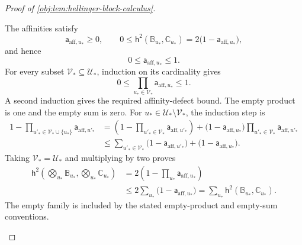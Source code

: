 \begin{proof}[Proof of \cref{obj:lem:hellinger-block-calculus}]
\begin{enumerate}
The affinities satisfy
\[
\mathsf a_{\mathrm{aff},u_*}\ge0,
\qquad
0\le\mathsf h^2(\mathbb B_{u_*},\mathbb C_{u_*})
   =2\bigl(1-\mathsf a_{\mathrm{aff},u_*}\bigr),
\]
and hence
\[
0\le\mathsf a_{\mathrm{aff},u_*}\le1.
\]
For every subset \(\mathcal V_*\subseteq\mathcal U_*\), induction on its cardinality gives
\[
0\le\prod_{u_*\in\mathcal V_*}\mathsf a_{\mathrm{aff},u_*}\le1.
\]
A second induction gives the required affinity-defect bound. The empty product is one and the empty sum is zero. For \(u_*\in\mathcal U_*\setminus\mathcal V_*\), the induction step is
\[
\begin{aligned}
1-\prod_{u'_*\in\mathcal V_*\cup\{u_*\}}
       \mathsf a_{\mathrm{aff},u'_*}
&=
\left(1-\prod_{u'_*\in\mathcal V_*}
       \mathsf a_{\mathrm{aff},u'_*}\right)
+
\bigl(1-\mathsf a_{\mathrm{aff},u_*}\bigr)
 \prod_{u'_*\in\mathcal V_*}\mathsf a_{\mathrm{aff},u'_*}\\
&\le
\sum_{u'_*\in\mathcal V_*}
 \bigl(1-\mathsf a_{\mathrm{aff},u'_*}\bigr)
+
\bigl(1-\mathsf a_{\mathrm{aff},u_*}\bigr).
\end{aligned}
\]
Taking \(\mathcal V_*=\mathcal U_*\) and multiplying by two proves
\[
\begin{aligned}
\mathsf h^2\left(\bigotimes_{u_*}\mathbb B_{u_*},
                \bigotimes_{u_*}\mathbb C_{u_*}\right)
&=2\left(1-\prod_{u_*}\mathsf a_{\mathrm{aff},u_*}\right)\\
&\le2\sum_{u_*}\bigl(1-\mathsf a_{\mathrm{aff},u_*}\bigr)
=\sum_{u_*}\mathsf h^2(\mathbb B_{u_*},\mathbb C_{u_*}).
\end{aligned}
\]
The empty family is included by the stated empty-product and empty-sum conventions.


\end{enumerate}
\end{proof}
